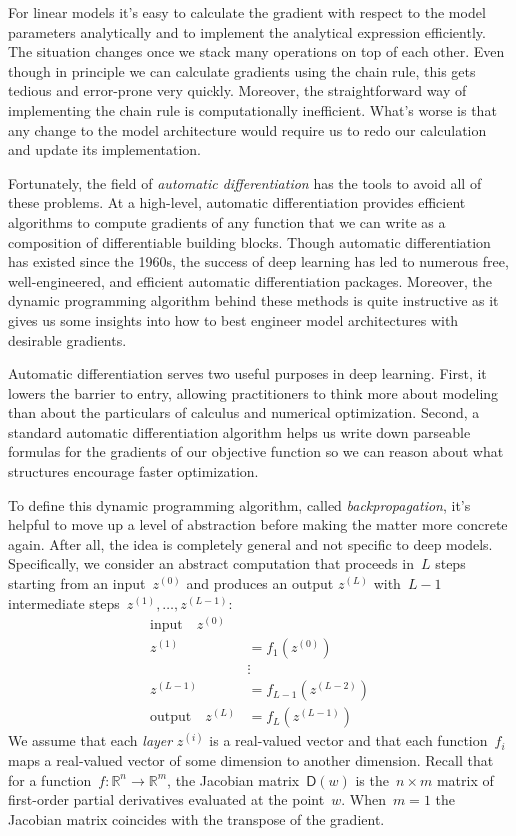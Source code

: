 \documentclass{tufte-book}
\begin{document}
For linear models it's easy to calculate the gradient with respect to
the model parameters analytically and to implement the analytical
expression efficiently. The situation changes once we stack many
operations on top of each other. Even though in principle we can
calculate gradients using the chain rule, this gets tedious and
error-prone very quickly. Moreover, the straightforward way of
implementing the chain rule is computationally inefficient. What's worse
is that any change to the model architecture would require us to redo
our calculation and update its implementation.

Fortunately, the field of \emph{automatic differentiation} has the tools
to avoid all of these problems. At a high-level, automatic
differentiation provides efficient algorithms to compute gradients of
any function that we can write as a composition of differentiable
building blocks. Though automatic differentiation has existed since the
1960s, the success of deep learning has led to numerous free,
well-engineered, and efficient automatic differentiation packages.
Moreover, the dynamic programming algorithm behind these methods is
quite instructive as it gives us some insights into how to best engineer
model architectures with desirable gradients.

Automatic differentiation serves two useful purposes in deep learning.
First, it lowers the barrier to entry, allowing practitioners to think
more about modeling than about the particulars of calculus and numerical
optimization. Second, a standard automatic differentiation algorithm
helps us write down parseable formulas for the gradients of our
objective function so we can reason about what structures encourage
faster optimization.

To define this dynamic programming algorithm, called
\emph{backpropagation}, it's helpful to move up a
level of abstraction before making the matter more concrete again. After
all, the idea is completely general and not specific to deep models.
Specifically, we consider an abstract computation that proceeds in~\(L\)
steps starting from an input~\(z^{(0)}\) and produces an output
\(z^{(L)}\) with~\(L-1\) intermediate steps~\(z^{(1)},\dots,z^{(L-1)}\):
\[
\begin{aligned}
  \text{input}\quad z^{(0)}\\
    z^{(1)} &= f_1(z^{(0)})\\
     &\vdots\\
    z^{(L-1)} &= f_{L-1}(z^{(L-2)})\\
\text{output}\quad z^{(L)} &=f_L(z^{(L-1)})
\end{aligned}
\] We assume that each \emph{layer} \(z^{(i)}\) is a real-valued vector
and that each function~\(f_i\) maps a real-valued vector of some
dimension to another dimension. Recall that for a
function~\(f\colon\mathbb{R}^n\to\mathbb{R}^m\), the Jacobian
matrix~\(\mathsf{D}(w)\) is the~\(n\times m\) matrix of first-order
partial derivatives evaluated at the point~\(w\). When~\(m=1\) the
Jacobian matrix coincides with the transpose of the gradient.
\end{document}

